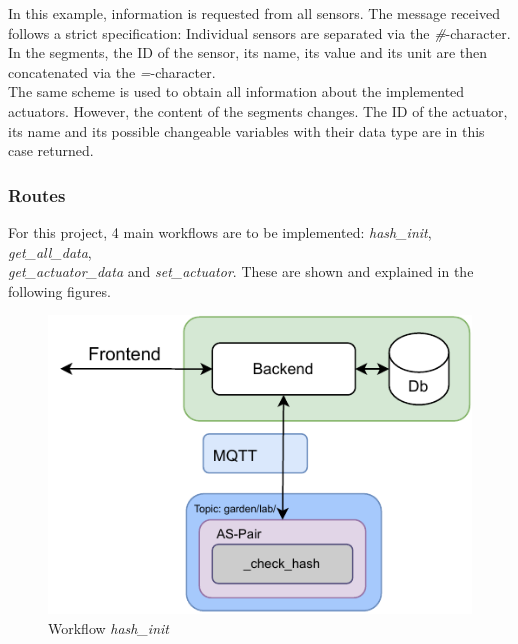In this example, information is requested from all sensors. The message received follows a strict specification: Individual sensors are separated via the \textit{\#}-character. In the segments, the ID of the sensor, its name, its value and its unit are then concatenated via the \textit{=}-character.\\

The same scheme is used to obtain all information about the implemented actuators. However, the content of the segments changes. The ID of the actuator, its name and its possible changeable variables with their data type are in this case returned.

\subsubsection{Routes}

For this project, 4 main workflows are to be implemented:  \textit{hash\_init}, \textit{get\_all\_data},\\ \textit{get\_actuator\_data} and \textit{set\_actuator}. These are shown and explained in the following figures.
\newpage

\begin{figure}
    \centering
     \captionsetup{justification=centering}
     \begin{minipage}[b]{0.53\textwidth}
         \centering
         \includegraphics[width=\textwidth]{images/4_2_1/hash_init.pdf}
         \caption{Workflow \textit{hash\_init}}
         \label{fig:hash_init}
     \end{minipage}
     \vspace{-.25\baselineskip}
\end{figure}

